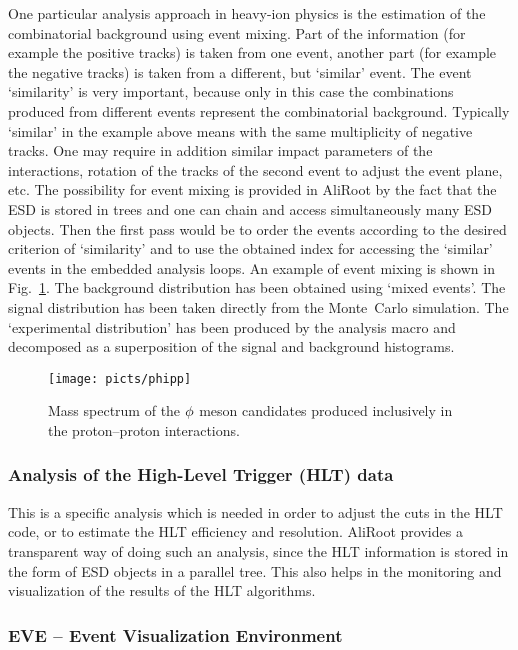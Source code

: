 \documentclass[12pt,a4paper,twoside]{article}
\makeatletter
\newcommand {\MC} {Monte~Carlo\@\xspace}
\newcommand {\aliroot} {AliRoot\@\xspace}
\makeatother
\begin{document}
{One particular analysis approach in heavy-ion physics is the
estimation of the combinatorial background using event mixing. Part of the
information (for example the positive tracks) is taken from one
event, another part (for example the negative tracks) is taken from
a different, but 
`similar' event. The event `similarity' is very important, because
only in this case the combinations produced from different events
represent the combinatorial background. Typically `similar' in
the example above means with the same multiplicity of negative
tracks. One may require in addition similar impact parameters of the
interactions, rotation of the tracks of the second event to adjust the
event plane, etc. The possibility for event mixing is provided in
\aliroot by the fact that the ESD is stored in trees and one can chain
and access simultaneously many ESD objects. Then the first pass would
be to order the events according to the desired criterion of
`similarity' and to use the obtained index for accessing the `similar'
events in the embedded analysis loops. An example of event mixing is
shown in Fig.~\ref{CH6Fig:phipp}. The background distribution has been
obtained using `mixed events'. The signal distribution has been taken
directly from the \MC simulation. The `experimental distribution' has
been produced by the analysis macro and decomposed as a
superposition of the signal and background histograms.

\begin{figure}[htb]
  \centering
  \texttt{[image: picts/phipp]}
  \caption{Mass spectrum of the ${\rm \phi}$ meson candidates produced
    inclusively in the proton--proton interactions.}
  \label{CH6Fig:phipp}
\end{figure}


\subsubsection{Analysis of the High-Level Trigger (HLT) data}

This is a specific analysis which is needed in order to adjust the cuts
in the HLT code, or to estimate the HLT
efficiency and resolution. \aliroot provides a transparent way of doing
such an analysis, since the HLT information is stored in the form of ESD
objects in a parallel tree. This also helps in the monitoring and
visualization of the results of the HLT algorithms.


\subsubsection{EVE -- Event Visualization Environment}

}
\end{document}
